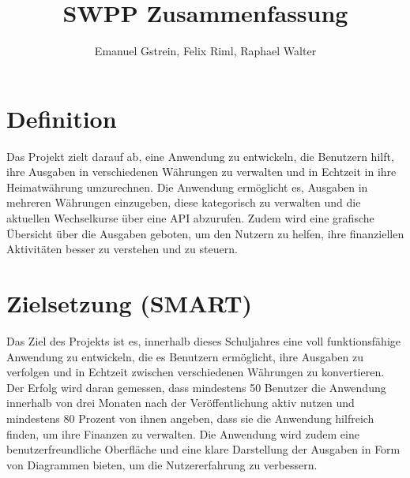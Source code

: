 \documentclass[ngerman]{report}
\title{SWPP Zusammenfassung}
\author{Emanuel Gstrein, Felix Riml, Raphael Walter}
\begin{document}
    \maketitle

    \newpage
    \tableofcontents
    \newpage

    \section{Definition}
    Das Projekt zielt darauf ab, eine Anwendung zu entwickeln, die Benutzern hilft, ihre Ausgaben in verschiedenen Währungen zu verwalten und in Echtzeit in ihre Heimatwährung umzurechnen. 
    Die Anwendung ermöglicht es, Ausgaben in mehreren Währungen einzugeben, diese kategorisch zu verwalten und die aktuellen Wechselkurse über eine API abzurufen. Zudem wird eine grafische 
    Übersicht über die Ausgaben geboten, um den Nutzern zu helfen, ihre finanziellen Aktivitäten besser zu verstehen und zu steuern.
    
    \section{Zielsetzung (SMART)}
    Das Ziel des Projekts ist es, innerhalb dieses Schuljahres
    eine voll funktionsfähige Anwendung zu entwickeln,
    die es Benutzern ermöglicht, ihre Ausgaben zu verfolgen
    und in Echtzeit zwischen verschiedenen Währungen zu konvertieren.
    Der Erfolg wird daran gemessen, dass mindestens 50 Benutzer
    die Anwendung innerhalb von drei Monaten nach der Veröffentlichung
    aktiv nutzen und mindestens 80 Prozent von ihnen angeben, dass sie die
    Anwendung hilfreich finden, um ihre Finanzen zu verwalten.
    Die Anwendung wird zudem eine benutzerfreundliche Oberfläche
    und eine klare Darstellung der Ausgaben in Form von Diagrammen bieten,
    um die Nutzererfahrung zu verbessern.

    

 
\end{document}
